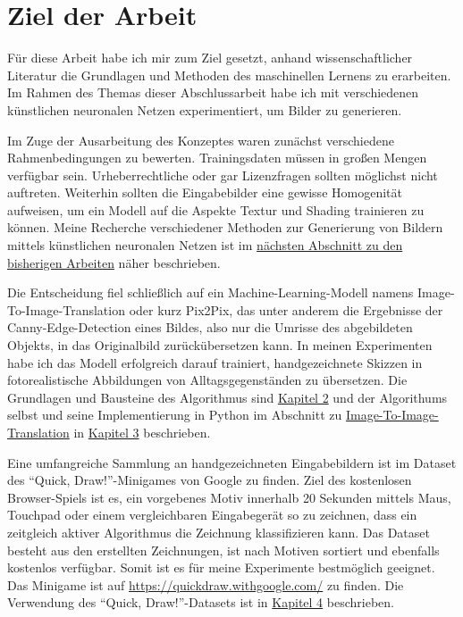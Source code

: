 \section{Ziel der Arbeit}
\label{sec:ziel}
Für diese Arbeit habe ich mir zum Ziel gesetzt, anhand wissenschaftlicher Literatur die Grundlagen und Methoden des maschinellen Lernens zu erarbeiten. Im Rahmen des Themas dieser Abschlussarbeit habe ich mit verschiedenen künstlichen neuronalen Netzen experimentiert, um Bilder zu generieren.

Im Zuge der Ausarbeitung des Konzeptes waren zunächst verschiedene Rahmenbedingungen zu bewerten. Trainingsdaten müssen in großen Mengen verfügbar sein. Urheberrechtliche oder gar Lizenzfragen sollten möglichst nicht auftreten. Weiterhin sollten die Eingabebilder eine gewisse Homogenität aufweisen, um ein Modell auf die Aspekte Textur und Shading trainieren zu können. Meine Recherche verschiedener Methoden zur Generierung von Bildern mittels künstlichen neuronalen Netzen ist im \hyperref[sec:related]{nächsten Abschnitt zu den bisherigen Arbeiten} näher beschrieben.

Die Entscheidung fiel schließlich auf ein Machine-Learning-Modell namens Image-To-Image-Translation \cite{isola2018imagetoimage} oder kurz Pix2Pix, das unter anderem die Ergebnisse der Canny-Edge-Detection \cite{canny1986edge} eines Bildes, also nur die Umrisse des abgebildeten Objekts, in das Originalbild zurückübersetzen kann. In meinen Experimenten habe ich das Modell erfolgreich darauf trainiert, handgezeichnete Skizzen in fotorealistische Abbildungen von Alltagsgegenständen zu übersetzen. Die Grundlagen und Bausteine des Algorithmus sind \hyperref[sec:model]{Kapitel 2} und der Algorithums selbst und seine Implementierung in Python im Abschnitt zu \hyperref[sec:pix2pix]{Image-To-Image-Translation} in \hyperref[ch:impl]{Kapitel 3} beschrieben.

Eine umfangreiche Sammlung an handgezeichneten Eingabebildern ist im Dataset des ``Quick, Draw!''-Minigames von Google zu finden. Ziel des kostenlosen Browser-Spiels ist es, ein vorgebenes Motiv innerhalb 20 Sekunden mittels Maus, Touchpad oder einem vergleichbaren Eingabegerät so zu zeichnen, dass ein zeitgleich aktiver Algorithmus die Zeichnung klassifizieren kann. Das Dataset besteht aus den erstellten Zeichnungen, ist nach Motiven sortiert und ebenfalls kostenlos verfügbar. Somit ist es für meine Experimente bestmöglich geeignet. Das Minigame ist auf \href{https://quickdraw.withgoogle.com/}{https://quickdraw.withgoogle.com/} zu finden. Die Verwendung des ``Quick, Draw!''-Datasets ist in \hyperref[ch:conduct]{Kapitel 4} beschrieben.

